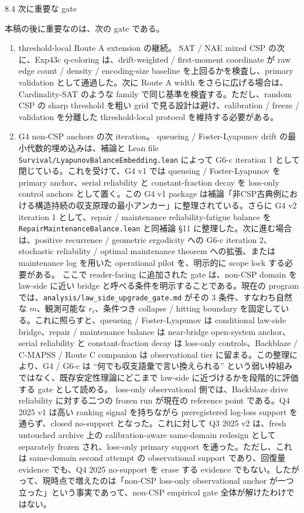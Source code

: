 \documentclass[12pt,a4paper]{article}
\begin{document}
8.4 次に重要な gate

本稿の後に重要なのは、次の gate である。

\begin{enumerate}
\def\labelenumi{\arabic{enumi}.}
\item
  threshold-local Route A extension の継続。 SAT / NAE mixed CSP の次に、Exp43c q-coloring は、drift-weighted / first-moment coordinate が raw edge count / density / encoding-size baseline を上回るかを検査し、primary validation として通過した。次に Route A width をさらに広げる場合は、Cardinality-SAT のような family で同じ基準を検査する。ただし、random CSP の sharp threshold を粗い grid で見る設計は避け、calibration / freeze / validation を分離した threshold-local protocol を維持する必要がある。
\item
  G4 non-CSP anchors の次 iteration。 queueing / Foster-Lyapunov drift の最小代数的埋め込みは、補論と Lean file \texttt{Survival/LyapunovBalanceEmbedding.lean} によって G6-c iteration 1 として閉じている。これを受けて、G4 v1 では queueing / Foster-Lyapunov を primary anchor、serial reliability と constant-fraction decay を loss-only control anchors として置く。この G4 v1 package は補論「非CSP古典例における構造持続の収支原理の最小アンカー」に整理されている。さらに G4 v2 iteration 1 として、repair / maintenance reliability-fatigue balance を \texttt{RepairMaintenanceBalance.lean} と同補論 §11 に整理した。次に進む場合は、positive recurrence / geometric ergodicity への G6-c iteration 2、stochastic reliability / optimal maintenance theorem への拡張、または maintenance log を用いた operational pilot を、明示的に scope lock する必要がある。 ここで reader-facing に追加された gate は、non-CSP domain を law-side に近い bridge と呼べる条件を明示することである。現在の program では、\texttt{analysis/law\_side\_upgrade\_gate.md} がその 3 条件、すなわち自然な \(m\)、観測可能な \(r_{t}\)、条件つき collapse / hitting boundary を固定している。これに照らすと、queueing / Foster-Lyapunov は conditional law-side bridge、repair / maintenance balance は near-bridge open-system anchor、serial reliability と constant-fraction decay は loss-only controls、Backblaze / C-MAPSS / Route C companion は observational tier に留まる。この整理により、G4 / G6-c は ``何でも収支語彙で言い換えられる'' という弱い枠組みではなく、既存安定性理論にどこまで law-side に近づけるかを段階的に評価する gate として読める。 loss-only observational 側では、Backblaze drive reliability に対する二つの frozen run が現在の reference point である。Q4 2025 v1 は高い ranking signal を持ちながら preregistered log-loss support を通らず、closed no-support となった。これに対して Q3 2025 v2 は、fresh untouched archive 上の calibration-aware same-domain redesign として separately frozen され、loss-only primary support を通った。ただし、これは same-domain second attempt の observational support であり、回復量 evidence でも、Q4 2025 no-support を erase する evidence でもない。したがって、現時点で増えたのは「non-CSP loss-only observational anchor が一つ立った」という事実であって、non-CSP empirical gate 全体が解けたわけではない。

\end{enumerate}
\end{document}
